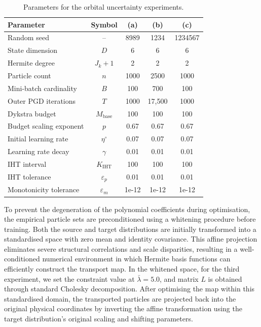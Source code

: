\begin{table}[htbp]
    \centering
    \caption{Parameters for the orbital uncertainty experiments.}
    \begin{tabular}{lcccc}
        \toprule
        \textbf{Parameter} & \textbf{Symbol} & \textbf{(a)} & \textbf{(b)} & \textbf{(c)} \\
        \midrule
        Random seed & --                            & 8989 & 1234 & 1234567 \\
        State dimension & $D$                       & 6 & 6 & 6 \\
        Hermite degree & $J_k + 1$                  & 2 & 2 & 2 \\
        Particle count & $n$                        & 1000 & 2500 & 1000 \\
        Mini-batch cardinality & $B$                & 100 & 700 & 100 \\
        Outer PGD iterations & $T$                  & 1000 & 17,500 & 1000 \\
        Dykstra budget & $M_{\mathrm{base}}$        & 100 & 100 & 100 \\
        Budget scaling exponent & $p$               & 0.67 & 0.67 & 0.67 \\
        Initial learning rate & $\eta^\circ$        & 0.07 & 0.07 & 0.07 \\
        Learning rate decay & $\gamma$              & 0.01 & 0.01 & 0.01 \\
        IHT interval & $K_{\mathrm{IHT}}$           & 100 & 100 & 100 \\
        IHT tolerance & $\varepsilon_p$             & 0.01 & 0.01 & 0.01 \\
        Monotonicity tolerance & $\varepsilon_m$    & 1e-12 & 1e-12 & 1e-12 \\
        \bottomrule
    \end{tabular}
    \label{tab:orbital_optimisation_parameters}
\end{table}

To prevent the degeneration of the polynomial coefficients during optimisation, the empirical particle sets are preconditioned using a whitening procedure before training. Both the source and target distributions are initially transformed into a standardised space with zero mean and identity covariance. This affine projection eliminates severe structural correlations and scale disparities, resulting in a well-conditioned numerical environment in which Hermite basis functions can efficiently construct the transport map. In the whitened space, for the third experiment, we set the constraint value at $\bar{\lambda} = 5.0$, and matrix $L$ is obtained through standard Cholesky decomposition. After optimising the map within this standardised domain, the transported particles are projected back into the original physical coordinates by inverting the affine transformation using the target distribution's original scaling and shifting parameters.

